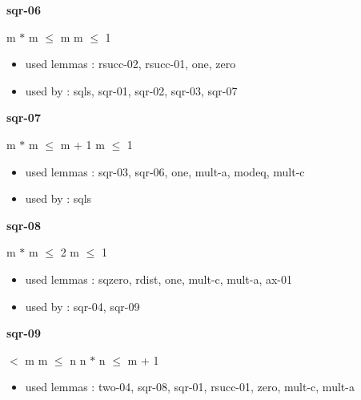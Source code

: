 \documentclass[a4paper]{article}
\begin{document}
\medskip

\bigskip

{\large\bf sqr-06}

\medskip

 \Fol m $*$ m $\le$ m \Equiv m $\le$ 1

\begin{itemize}


\item       used lemmas  : rsucc-02, rsucc-01, one, zero
\item       used by      : sqls, sqr-01, sqr-02, sqr-03, sqr-07

\end{itemize}

\medskip

\bigskip

{\large\bf sqr-07}

\medskip

 \Fol m $*$ m $\le$ m + 1 \Equiv m $\le$ 1

\begin{itemize}


\item       used lemmas  : sqr-03, sqr-06, one, mult-a, modeq, mult-c
\item       used by      : sqls

\end{itemize}

\medskip

\bigskip

{\large\bf sqr-08}

\medskip

 \Fol m $*$ m $\le$ 2 \Equiv m $\le$ 1

\begin{itemize}


\item       used lemmas  : sqzero, rdist, one, mult-c, mult-a, ax-01
\item       used by      : sqr-04, sqr-09

\end{itemize}

\medskip

\bigskip

{\large\bf sqr-09}

\medskip

  $<$ m \And m $\le$ n \Imp \Not n $*$ n $\le$ m + 1

\begin{itemize}


\item       used lemmas  : two-04, sqr-08, sqr-01, rsucc-01, zero, mult-c, mult-a

\end{itemize}
\end{document}

